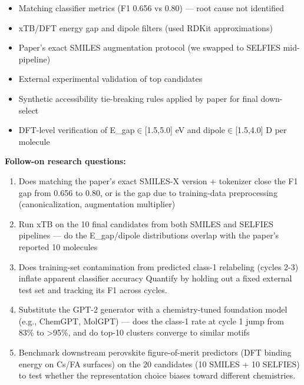 \documentclass[11pt]{article}
\begin{document}
\begin{itemize}[leftmargin=1.4em,itemsep=0.2em,topsep=0.2em]
\item Matching classifier metrics (F1 0.656 vs 0.80) --- root cause not identified
\item xTB/DFT energy gap and dipole filters (used RDKit approximations)
\item Paper's exact SMILES augmentation protocol (we swapped to SELFIES mid-pipeline)
\item External experimental validation of top candidates
\item Synthetic accessibility tie-breaking rules applied by paper for final down-select
\item DFT-level verification of E\_gap$\in$[1.5,5.0] eV and dipole$\in$[1.5,4.0] D per molecule
\end{itemize}\noindent\textbf{Follow-on research questions:}
\begin{enumerate}[leftmargin=1.6em,itemsep=0.2em,topsep=0.2em,label=Q\arabic*.]
\item Does matching the paper's exact SMILES-X version + tokenizer close the F1 gap from 0.656 to 0.80, or is the gap due to training-data preprocessing (canonicalization, augmentation multiplier)
\item Run xTB on the 10 final candidates from both SMILES and SELFIES pipelines --- do the E\_gap/dipole distributions overlap with the paper's reported 10 molecules
\item Does training-set contamination from predicted class-1 relabeling (cycles 2-3) inflate apparent classifier accuracy Quantify by holding out a fixed external test set and tracking its F1 across cycles.
\item Substitute the GPT-2 generator with a chemistry-tuned foundation model (e.g., ChemGPT, MolGPT) --- does the class-1 rate at cycle 1 jump from 83\% to \textgreater{}95\%, and do top-10 clusters converge to similar motifs
\item Benchmark downstream perovskite figure-of-merit predictors (DFT binding energy on Cs/FA surfaces) on the 20 candidates (10 SMILES + 10 SELFIES) to test whether the representation choice biases toward different chemistries.
\end{enumerate}
\end{document}
